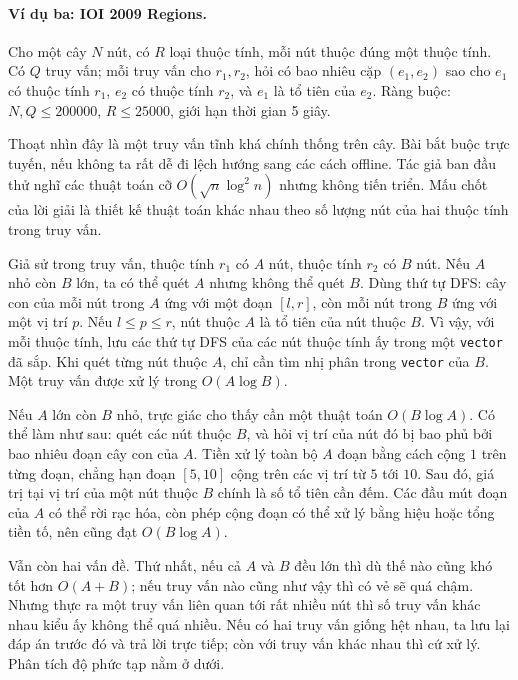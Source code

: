 \documentclass[11pt]{article}
\begin{document}
\paragraph{Ví dụ ba: IOI 2009 Regions.}
Cho một cây \(N\) nút, có \(R\) loại thuộc tính, mỗi nút thuộc đúng một thuộc
tính. Có \(Q\) truy vấn; mỗi truy vấn cho \(r_1,r_2\), hỏi có bao nhiêu cặp
\((e_1,e_2)\) sao cho \(e_1\) có thuộc tính \(r_1\), \(e_2\) có thuộc tính
\(r_2\), và \(e_1\) là tổ tiên của \(e_2\). Ràng buộc:
\(N,Q\le 200000\), \(R\le 25000\), giới hạn thời gian 5 giây.

Thoạt nhìn đây là một truy vấn tĩnh khá chính thống trên cây. Bài bắt buộc
trực tuyến, nếu không ta rất dễ đi lệch hướng sang các cách offline. Tác giả
ban đầu thử nghĩ các thuật toán cỡ \(O(\sqrt n\log^2 n)\) nhưng không tiến
triển. Mấu chốt của lời giải là thiết kế thuật toán khác nhau theo số lượng
nút của hai thuộc tính trong truy vấn.

Giả sử trong truy vấn, thuộc tính \(r_1\) có \(A\) nút, thuộc tính \(r_2\) có
\(B\) nút. Nếu \(A\) nhỏ còn \(B\) lớn, ta có thể quét \(A\) nhưng không thể
quét \(B\). Dùng thứ tự DFS: cây con của mỗi nút trong \(A\) ứng với một đoạn
\([l,r]\), còn mỗi nút trong \(B\) ứng với một vị trí \(p\). Nếu
\(l\le p\le r\), nút thuộc \(A\) là tổ tiên của nút thuộc \(B\). Vì vậy, với
mỗi thuộc tính, lưu các thứ tự DFS của các nút thuộc tính ấy trong một
\texttt{vector} đã sắp. Khi quét từng nút thuộc \(A\), chỉ cần tìm nhị phân
trong \texttt{vector} của \(B\). Một truy vấn được xử lý trong
\(O(A\log B)\).

Nếu \(A\) lớn còn \(B\) nhỏ, trực giác cho thấy cần một thuật toán
\(O(B\log A)\). Có thể làm như sau: quét các nút thuộc \(B\), và hỏi vị trí
của nút đó bị bao phủ bởi bao nhiêu đoạn cây con của \(A\). Tiền xử lý toàn bộ
\(A\) đoạn bằng cách cộng \(1\) trên từng đoạn, chẳng hạn đoạn \([5,10]\) cộng
trên các vị trí từ \(5\) tới \(10\). Sau đó, giá trị tại vị trí của một nút
thuộc \(B\) chính là số tổ tiên cần đếm. Các đầu mút đoạn của \(A\) có thể rời
rạc hóa, còn phép cộng đoạn có thể xử lý bằng hiệu hoặc tổng tiền tố, nên cũng
đạt \(O(B\log A)\).

Vẫn còn hai vấn đề. Thứ nhất, nếu cả \(A\) và \(B\) đều lớn thì dù thế nào
cũng khó tốt hơn \(O(A+B)\); nếu truy vấn nào cũng như vậy thì có vẻ sẽ quá
chậm. Nhưng thực ra một truy vấn liên quan tới rất nhiều nút thì số truy vấn
khác nhau kiểu ấy không thể quá nhiều. Nếu có hai truy vấn giống hệt nhau, ta
lưu lại đáp án trước đó và trả lời trực tiếp; còn với truy vấn khác nhau thì
cứ xử lý. Phân tích độ phức tạp nằm ở dưới.
\end{document}

